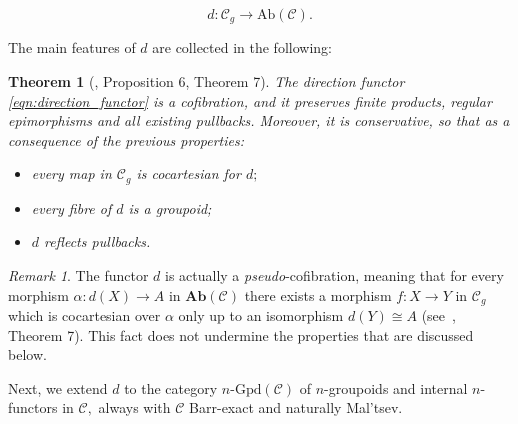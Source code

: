 \documentclass[11pt]{amsart}
\theoremstyle{plain}
\newtheorem{theorem}[subsubsection]{Theorem}
\theoremstyle{definition}
\theoremstyle{remark}
\newtheorem{remark}[subsubsection]{Remark}
\begin{document}
\begin{equation}
\label{eqn:direction_functor}
d\colon\mathcal{C}_g \longrightarrow \mathrm{Ab}(\mathcal{C}).
\end{equation}

The main features of $d$ are collected in the following:
\begin{theorem}[{\cite{baer-sums}, Proposition 6, Theorem 7}]
\label{thm:properties_of_d}
The direction functor \eqref{eqn:direction_functor} is a cofibration, and it preserves finite products, regular epimorphisms and all existing pullbacks. Moreover, it is conservative, so that as a consequence of the previous properties:
\begin{itemize}
\item every map in $\mathcal{C}_g$ is cocartesian for $d;$
\item every fibre of $d$ is a groupoid;
\item $d$ reflects pullbacks.
\end{itemize}
\end{theorem}
\begin{remark}
The functor $d$ is actually a \emph{pseudo}-cofibration, meaning that for every morphism $\alpha\colon d(X)\rightarrow A$ in $\mathbf{Ab}(\mathcal{C})$ there exists a morphism $f\colon X\rightarrow Y$ in $\mathcal{C}_g$ which is cocartesian over $\alpha$ only up to an isomorphism $d(Y)\cong A$ (see~\cite{baer-sums}, Theorem 7). This fact does not undermine the properties that are discussed below.
\end{remark}
Next, we extend $d$ to the category $n$-$\mathrm{Gpd}(\mathcal{C})$ of $n$-groupoids and internal $n$-functors in $\mathcal{C},$ always with $\mathcal{C}$ Barr-exact and naturally Mal'tsev.
\end{document}
